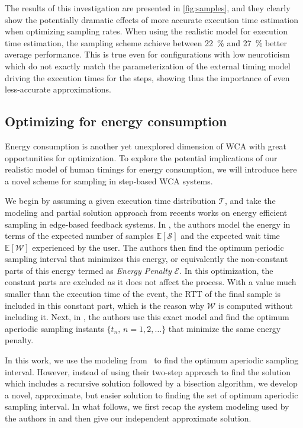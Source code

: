 The results of this investigation are presented in \cref{fig:samples}, and they clearly show the potentially dramatic effects of more accurate execution time estimation when optimizing sampling rates.
When using the realistic model for execution time estimation, the sampling scheme achieve between \SI{22}{\percent} and \SI{27}{\percent} better average performance.
This is true even for configurations with low neuroticism which do not exactly match the parameterization of the external timing model driving the execution times for the steps, showing thus the importance of even less-accurate approximations.

\subsection{Optimizing for energy consumption}

Energy consumption is another yet unexplored dimension of \ac{WCA} with great opportunities for optimization.
To explore the potential implications of our realistic model of human timings for energy consumption, we will introduce here a novel scheme for sampling in step-based \ac{WCA} systems.

We begin by assuming a given execution time distribution \( \mathcal{T} \), and take the modeling and partial solution approach from recents works on energy efficient sampling in edge-based feedback systems.
In \textcite{ICCperiodic1,TMCperiodic}, the authors model the energy in terms of the expected number of samples $\mathbb{E}[\mathcal{S}]$ and the expected wait time $\mathbb{E}[\mathcal{W}]$ experienced by the user.
The authors then find the optimum periodic sampling interval that minimizes this energy, or equivalently the non-constant parts of this energy termed as \textit{Energy Penalty} $\mathcal{E}$.
In this optimization, the constant parts are excluded as it does not affect the process.
With a value much smaller than the execution time of the event, the \ac{RTT} of the final sample is included in this constant part, which is the reason why $\mathcal{W}$ is computed without including it.
Next, in \textcite{secAperiodic}, the authors use this exact model and find the optimum aperiodic sampling instants $\{t_n,\,n=1,2,\dots\}$ that minimize the same energy penalty.

In this work, we use the modeling from~\cite{secAperiodic} to find the optimum aperiodic sampling interval.
However, instead of using their two-step approach to find the solution which includes a recursive solution followed by a bisection algorithm, we develop a novel, approximate, but easier solution to finding the set of optimum aperiodic sampling interval.
In what follows, we first recap the system modeling used by the authors \textcite{secAperiodic} in and then give our independent approximate solution.

